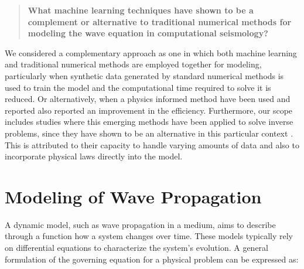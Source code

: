 \documentclass[11pt,twoside]{article}
\begin{document}
\vspace*{2mm}

\begin{tcolorbox}[colback=gray!20, colframe=gray!20, sharp corners]
\begin{quote}
\noindent\textbf{What machine learning techniques have shown to be a complement or alternative to traditional 
numerical methods for modeling the wave equation in computational seismology?}
\end{quote}
\end{tcolorbox}

\vspace*{2mm}

We considered a complementary approach as one in which both machine learning and traditional numerical methods are 
employed together for modeling, particularly when synthetic data generated by standard numerical methods is used to 
train the model and the computational time required to solve it is reduced. Or alternatively,
when a physics informed method have been used and reported also reported an improvement in the efficiency. 
Furthermore, our scope includes studies where this emerging methods have been applied to solve inverse problems, since 
they have shown to be an alternative in this particular context \citep{haghighat_physics-informed_2021,
raissi_hidden_2020, hao_physics-informed_2023}. This is attributed to their capacity to handle varying amounts 
of data and also to incorporate physical laws directly into the model.

\section{Modeling of Wave Propagation}\label{sec:modeling_wave_propagation}

A dynamic model, such as wave propagation in a medium, aims to describe through a function how a system changes over time. 
These models typically rely on differential equations to characterize the system's evolution. A general formulation of 
the governing equation for a physical problem can be expressed as:
\end{document}
